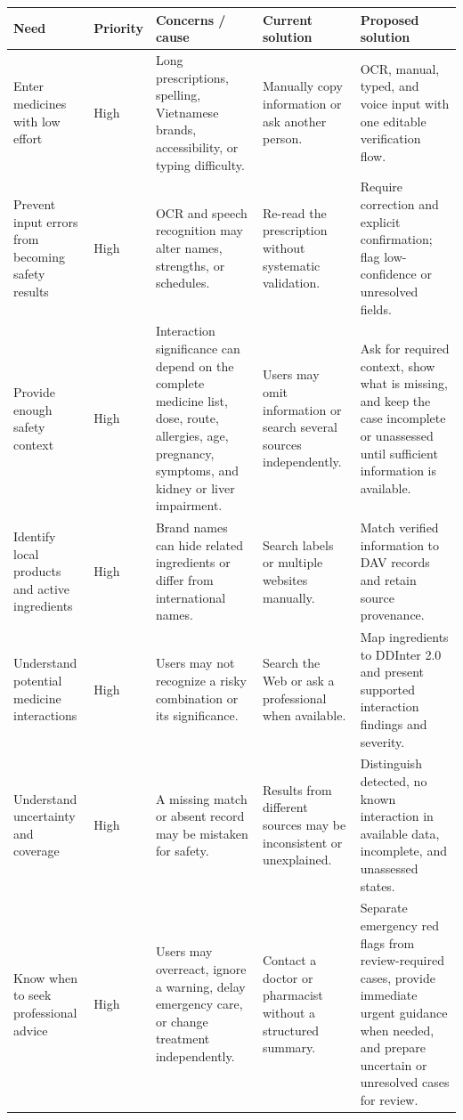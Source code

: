 \begin{longtable}{|L{0.21\textwidth}|L{0.09\textwidth}|L{0.20\textwidth}|L{0.20\textwidth}|L{0.20\textwidth}|}
\hline
\textbf{Need} & \textbf{Priority} & \textbf{Concerns / cause} & \textbf{Current solution} & \textbf{Proposed solution}\\ \hline
Enter medicines with low effort & High & Long prescriptions, spelling, Vietnamese brands, accessibility, or typing difficulty. & Manually copy information or ask another person. & OCR, manual, typed, and voice input with one editable verification flow.\\ \hline
Prevent input errors from becoming safety results & High & OCR and speech recognition may alter names, strengths, or schedules. & Re-read the prescription without systematic validation. & Require correction and explicit confirmation; flag low-confidence or unresolved fields.\\ \hline
Provide enough safety context & High & Interaction significance can depend on the complete medicine list, dose, route, allergies, age, pregnancy, symptoms, and kidney or liver impairment. & Users may omit information or search several sources independently. & Ask for required context, show what is missing, and keep the case incomplete or unassessed until sufficient information is available.\\ \hline
Identify local products and active ingredients & High & Brand names can hide related ingredients or differ from international names. & Search labels or multiple websites manually. & Match verified information to DAV records and retain source provenance.\\ \hline
Understand potential medicine interactions & High & Users may not recognize a risky combination or its significance. & Search the Web or ask a professional when available. & Map ingredients to DDInter 2.0 and present supported interaction findings and severity.\\ \hline
Understand uncertainty and coverage & High & A missing match or absent record may be mistaken for safety. & Results from different sources may be inconsistent or unexplained. & Distinguish detected, no known interaction in available data, incomplete, and unassessed states.\\ \hline
Know when to seek professional advice & High & Users may overreact, ignore a warning, delay emergency care, or change treatment independently. & Contact a doctor or pharmacist without a structured summary. & Separate emergency red flags from review-required cases, provide immediate urgent guidance when needed, and prepare uncertain or unresolved cases for review.\\ \hline

\end{longtable}
